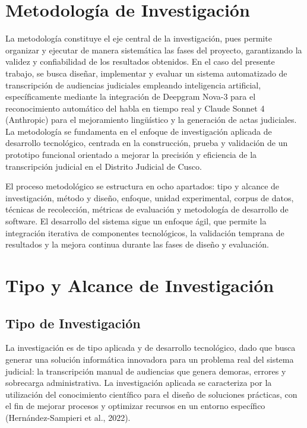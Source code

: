 \documentclass[12pt,a4paper,oneside]{report}
\begin{document}
\section{Metodología de Investigación}

La metodología constituye el eje central de la investigación, pues permite organizar y ejecutar de manera sistemática las fases del proyecto, garantizando la validez y confiabilidad de los resultados obtenidos. En el caso del presente trabajo, se busca diseñar, implementar y evaluar un sistema automatizado de transcripción de audiencias judiciales empleando inteligencia artificial, específicamente mediante la integración de Deepgram Nova-3 para el reconocimiento automático del habla en tiempo real y Claude Sonnet 4 (Anthropic) para el mejoramiento lingüístico y la generación de actas judiciales. La metodología se fundamenta en el enfoque de investigación aplicada de desarrollo tecnológico, centrada en la construcción, prueba y validación de un prototipo funcional orientado a mejorar la precisión y eficiencia de la transcripción judicial en el Distrito Judicial de Cusco.

El proceso metodológico se estructura en ocho apartados: tipo y alcance de investigación, método y diseño, enfoque, unidad experimental, corpus de datos, técnicas de recolección, métricas de evaluación y metodología de desarrollo de software. El desarrollo del sistema sigue un enfoque ágil, que permite la integración iterativa de componentes tecnológicos, la validación temprana de resultados y la mejora continua durante las fases de diseño y evaluación.

\section{Tipo y Alcance de Investigación}

\subsection{Tipo de Investigación}

La investigación es de tipo aplicada y de desarrollo tecnológico, dado que busca generar una solución informática innovadora para un problema real del sistema judicial: la transcripción manual de audiencias que genera demoras, errores y sobrecarga administrativa. La investigación aplicada se caracteriza por la utilización del conocimiento científico para el diseño de soluciones prácticas, con el fin de mejorar procesos y optimizar recursos en un entorno específico (Hernández-Sampieri et al., 2022).
\end{document}
